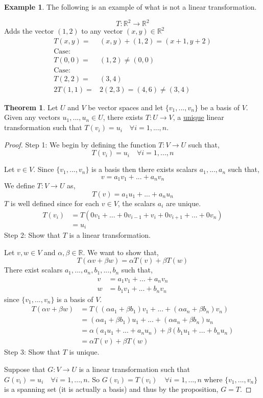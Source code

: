 \documentclass{report}
\theoremstyle{definition}
\newtheorem{_thm}{Theorem}[section]
\newtheorem{ex}{Example}[section]
\theoremstyle{remark}
\begin{document}
\begin{ex}
The following is an example of what is not a linear transformation.

\[T:\mathbb{R}^2\rightarrow\mathbb{R}^2\]
Adds the vector $(1,2)$ to any vector $(x,y)\in\mathbb{R}^2$
\begin{align*}
T(x,y)=&(x,y)+(1,2)=(x+1,y+2) \\
\text{Case: }&\\
T(0,0)=&(1,2)\neq (0,0) \\
\text{Case: }&\\
T(2,2)=&(3,4)\\
2T(1,1)=&2(2,3)=(4,6)\neq (3,4)
\end{align*}
\end{ex}

\begin{_thm}
Let $U$ and $V$ be vector spaces and let $\{v_1,...,v_n\}$ be a basis of $V$.
Given any vectors $u_1,...,u_n\in U$, there exists $T:U\rightarrow V$, a \underline{unique} linear transformation such that $T(v_i)=u_i\quad \forall i=1,...,n$.
\end{_thm}

\begin{proof}
Step 1: We begin by defining the function $T:V\rightarrow U$ such that,
\[T(v_i)=u_i\quad \forall i=1,...,n\]

Let $v\in V$.
Since $\{v_1,...,v_n\}$ is a basis then there exists scalars $a_1,...,a_n$ such that,
\[v=a_1v_1+...+a_nv_n\]
We define $T:V\rightarrow U$ as,
\[T(v)=a_1u_1+...+a_nu_n\]
$T$ is well defined since for each $v\in V$, the scalars $a_i$ are unique.
\begin{align*}
 T(v_i)&=T(0v_1+...+0v_{i-1}+v_i+0v_{i+1}+...+0v_n) \\
 &=u_i
\end{align*}
Step 2: Show that $T$ is a linear transformation.

Let $v, w\in V$ and $\alpha, \beta\in \mathbb{R}$.
We want to show that,
\[T(\alpha v+\beta w)=\alpha T(v)+\beta T(w)\]
There exist scalars $a_1,...,a_n,b_1,...,b_n$ such that,
\begin{align*}
 v&=a_1v_1+...+a_nv_n\\
 w&=b_1v_1+...+b_nv_n
\end{align*}
since $\{v_1,...,v_n\}$ is a basis of $V$.
\begin{align*}
 T(\alpha v+\beta w)&=T((\alpha a_1+\beta b_1)v_1+...+(\alpha a_n+\beta b_n)v_n)\\
 &=(\alpha a_1+\beta b_1)u_1+...+(\alpha a_n+\beta b_n)u_n\\
 &=\alpha(a_1u_1+...+a_nu_n)+\beta(b_1u_1+...+b_nu_n)\\
 &=\alpha T(v)+\beta T(w)
\end{align*}
Step 3: Show that $T$ is unique.

Suppose that $G:V\rightarrow U$ is a linear transformation such that $G(v_i)=u_i\quad\forall i=1,...,n$.
So $G(v_i)=T(v_i) \quad\forall i=1,...,n$ where $\{v_1,...,v_n\}$ is a spanning set (it is actually a basis) and thus by the proposition, $G=T$.
\end{proof}
\end{document}
